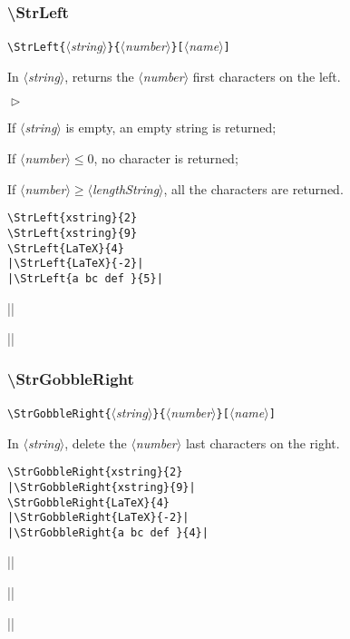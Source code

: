 \documentclass[a4paper,10pt]{article}
\newcommand\argu[1]{$\langle$\textit{#1}$\rangle$}
\newcommand\ARGU[1]{\texttt{\{}\argu{#1}\texttt{\}}}
\newcommand\arguC[1]{\texttt{[}\argu{#1}\texttt{]}}
\newenvironment{Conditions}[1][1cm]%
{\begin{list}%
	{$\vartriangleright$}%
	{\setlength{\leftmargin}{#1}
	 \setlength{\itemsep}{0pt}
	 \setlength{\parsep}{0pt}
	 \setlength{\topsep}{2ptplus3ptminus2pt}
	}}%
{\end{list}}
\newcommand\styleexemple{\small\vskip4pt}
\newcommand\verbinline{\lstinline[basicstyle=\normalsize\ttfamily]}
\begin{document}
\subsubsection{\ttfamily\textbackslash StrLeft}

\verbinline|\StrLeft|\ARGU{string}\ARGU{number}\arguC{name}
\smallskip

In \argu{string}, returns the \argu{number} first characters on the left.\medskip

\begin{Conditions}
\item If \argu{string} is empty, an empty string is returned;
\item If \argu{number}${}\leqslant0$, no character is returned;
\item If \argu{number}${}\geqslant{}$\argu{lengthString}, all the characters are returned.
\end{Conditions}

\begin{minipage}[t]{0.65\linewidth}
\begin{lstlisting}
\StrLeft{xstring}{2}
\StrLeft{xstring}{9}
\StrLeft{LaTeX}{4}
|\StrLeft{LaTeX}{-2}|
|\StrLeft{a bc def }{5}|
\end{lstlisting}%
\end{minipage}\hfill
\begin{minipage}[t]{0.35\linewidth}
	\styleexemple
	\par
	\par
	\par
	||\par
	||
\end{minipage}%

\subsubsection{\ttfamily\textbackslash StrGobbleRight}

\verbinline|\StrGobbleRight|\ARGU{string}\ARGU{number}\arguC{name}
\smallskip

In \argu{string}, delete the \argu{number} last characters on the right.\medskip

\begin{minipage}[t]{0.65\linewidth}
\begin{lstlisting}
\StrGobbleRight{xstring}{2}
|\StrGobbleRight{xstring}{9}|
\StrGobbleRight{LaTeX}{4}
|\StrGobbleRight{LaTeX}{-2}|
|\StrGobbleRight{a bc def }{4}|
\end{lstlisting}%
\end{minipage}\hfill
\begin{minipage}[t]{0.35\linewidth}
	\styleexemple
	\par
	||\par
	\par
	||\par
	||
\end{minipage}%
\end{document}
